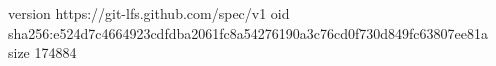 version https://git-lfs.github.com/spec/v1
oid sha256:e524d7c4664923cdfdba2061fc8a54276190a3c76cd0f730d849fc63807ee81a
size 174884
